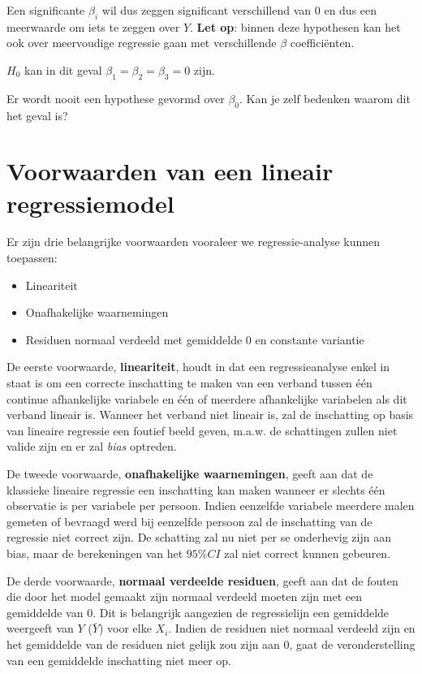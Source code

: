 \documentclass[
]{book}
\providecommand{\tightlist}{%
  \setlength{\itemsep}{0pt}\setlength{\parskip}{0pt}}
\theoremstyle{definition}
\theoremstyle{definition}
\theoremstyle{definition}
\theoremstyle{definition}
\theoremstyle{remark}
\begin{document}
Een significante \(\beta_i\) wil dus zeggen significant verschillend van 0 en dus een meerwaarde om iets te zeggen over \(Y\). \textbf{Let op}: binnen deze hypothesen kan het ook over meervoudige regressie gaan met verschillende \(\beta\) coefficiënten.

\(H_0\) kan in dit geval \(\beta_1 = \beta_2 = \beta_3 = 0\) zijn.

Er wordt nooit een hypothese gevormd over \(\beta_0\). Kan je zelf bedenken waarom dit het geval is?

\hypertarget{voorwaarden-van-een-lineair-regressiemodel}{%
\section*{Voorwaarden van een lineair regressiemodel}\label{voorwaarden-van-een-lineair-regressiemodel}}


Er zijn drie belangrijke voorwaarden vooraleer we regressie-analyse kunnen toepassen:

\begin{itemize}
\tightlist
\item
  Lineariteit
\item
  Onafhakelijke waarnemingen
\item
  Residuen normaal verdeeld met gemiddelde 0 en constante variantie
\end{itemize}

De eerste voorwaarde, \textbf{lineariteit}, houdt in dat een regressieanalyse enkel in staat is om een correcte inschatting te maken van een verband tussen één continue afhankelijke variabele en één of meerdere afhankelijke variabelen als dit verband lineair is. Wanneer het verband niet lineair is, zal de inschatting op basis van lineaire regressie een foutief beeld geven, m.a.w. de schattingen zullen niet valide zijn en er zal \emph{bias} optreden.

De tweede voorwaarde, \textbf{onafhakelijke waarnemingen}, geeft aan dat de klassieke lineaire regressie een inschatting kan maken wanneer er slechts één observatie is per variabele per persoon. Indien eenzelfde variabele meerdere malen gemeten of bevraagd werd bij eenzelfde persoon zal de inschatting van de regressie niet correct zijn. De schatting zal nu niet per se onderhevig zijn aan bias, maar de berekeningen van het \(95\% CI\) zal niet correct kunnen gebeuren.

De derde voorwaarde, \textbf{normaal verdeelde residuen}, geeft aan dat de fouten die door het model gemaakt zijn normaal verdeeld moeten zijn met een gemiddelde van 0. Dit is belangrijk aangezien de regressielijn een gemiddelde weergeeft van \(Y\) (\(\bar{Y}\)) voor elke \(X_i\). Indien de residuen niet normaal verdeeld zijn en het gemiddelde van de residuen niet gelijk zou zijn aan 0, gaat de veronderstelling van een gemiddelde inschatting niet meer op.
\end{document}
